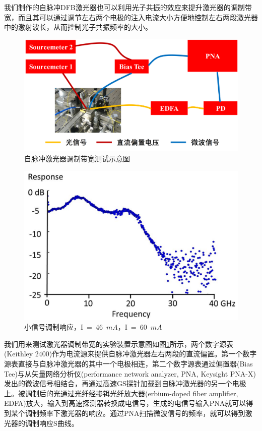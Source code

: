 我们制作的自脉冲DFB激光器也可以利用光子共振的效应来提升激光器的调制带宽，而且其可以通过调节左右两个电极的注入电流大小方便地控制左右两段激光器中的激射波长，从而控制光子共振频率的大小。

\begin{figure}[htb]
	\centering
	\includegraphics[width=15cm]{./Pictures/laser_s21_setup.jpg}
	\captionsetup{justification=centering}
	\caption{自脉冲激光器调制带宽测试示意图}
	\label{laser_s21_setup}
\end{figure}

\begin{figure}[htb]
	\centering
	\includegraphics[width=12cm]{./Pictures/laser_s21.jpg}
	\captionsetup{justification=centering}
	\caption{小信号调制响应，I~=~46~$mA$，I~=~60~$mA$\cite{shahin201845}}
	\label{laser_s21}
\end{figure}

我们用来测试激光器调制带宽的实验装置示意图如图\ref{laser_s21_setup}所示，两个数字源表(Keithley 2400)作为电流源来提供自脉冲激光器左右两段的直流偏置。第一个数字源表直接与自脉冲激光器的其中一个电极相连，第二个数字源表通过偏置器(Bias Tee)与从矢量网络分析仪(performance network analyzer, PNA, Keysight PNA-X)发出的微波信号相结合，再通过高速GS探针加载到自脉冲激光器的另一个电极上。被调制后的光通过光纤经掺铒光纤放大器(erbium-doped fiber amplifier, EDFA)放大，输入到高速探测器转换成电信号，生成的电信号输入PNA就可以得到某个调制频率下激光器的响应。通过PNA扫描微波信号的频率，就可以得到激光器的调制响应S曲线。

